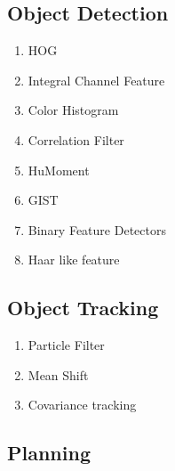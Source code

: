 \subsection{Object Detection}

\begin{enumerate}
    \item HOG
    \item Integral Channel Feature
    \item Color Histogram
    \item Correlation Filter
    \item HuMoment
    \item GIST
    \item Binary Feature Detectors
    \item Haar like feature
\end{enumerate}

\subsection{Object Tracking}

\begin{enumerate}
    \item Particle Filter
    \item Mean Shift
    \item Covariance tracking
\end{enumerate}

\subsection{Planning}

